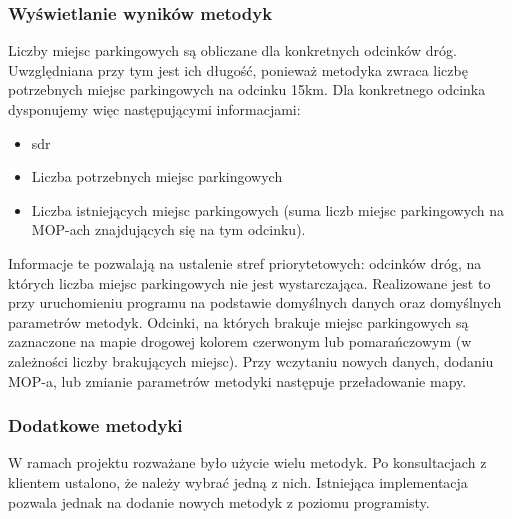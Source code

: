 \subsubsection{Wyświetlanie wyników metodyk}
Liczby miejsc parkingowych są obliczane dla konkretnych odcinków dróg.
Uwzględniana przy tym jest ich długość, ponieważ metodyka zwraca liczbę
potrzebnych miejsc parkingowych na odcinku 15km. Dla konkretnego odcinka
dysponujemy więc następującymi informacjami: 
\begin{itemize}
  \item \acrshort{sdr}
  \item Liczba potrzebnych miejsc parkingowych
  \item Liczba istniejących miejsc parkingowych (suma liczb miejsc
    parkingowych na MOP-ach znajdujących się na tym odcinku).
\end{itemize}
Informacje te pozwalają na ustalenie stref priorytetowych: odcinków dróg, na
których liczba miejsc parkingowych nie jest wystarczająca. Realizowane jest to
przy uruchomieniu programu na podstawie domyślnych danych oraz domyślnych
parametrów metodyk. Odcinki, na których brakuje miejsc parkingowych są
zaznaczone na mapie drogowej kolorem czerwonym lub pomarańczowym (w zależności
liczby brakujących miejsc). Przy wczytaniu nowych danych,
dodaniu MOP-a, lub zmianie parametrów metodyki następuje przeładowanie mapy. 

\subsubsection{Dodatkowe metodyki} 
W ramach projektu rozważane było użycie wielu metodyk. Po konsultacjach z
klientem ustalono, że należy wybrać jedną z nich. Istniejąca implementacja
pozwala jednak na dodanie nowych metodyk z poziomu
programisty.


